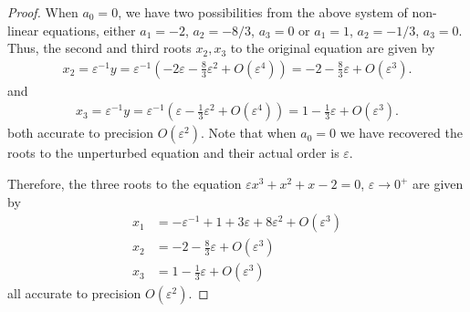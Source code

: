 \documentclass[12pt]{article}
\theoremstyle{definition}
\begin{document}
\begin{proof}
  When $a_0 = 0$, we have two possibilities from the above system of non-linear equations, either
  $a_1 = -2$, $a_2 = -8/3$, $a_3 = 0$ or $a_1=1$, $a_2 = -1/3$, $a_3 = 0$.
  Thus, the second and third roots $x_2, x_3$ to the original equation are given by
  \begin{align*}
    x_2 = \varepsilon^{-1}y = \varepsilon^{-1}\left(-2\varepsilon -\frac{8}{3} \varepsilon^2  + O(\varepsilon^4)\right) = -2 -\frac{8}{3} \varepsilon  + O(\varepsilon^3).
  \end{align*}
  and
  \begin{align*}
    x_3 = \varepsilon^{-1}y = \varepsilon^{-1}\left(\varepsilon -\frac{1}{3} \varepsilon^2  + O(\varepsilon^4)\right) = 1 -\frac{1}{3} \varepsilon  + O(\varepsilon^3).
  \end{align*}
  both accurate to precision $O(\varepsilon^2)$. Note that when $a_0 =0$ we have recovered the roots to the unperturbed equation and their actual order is $\varepsilon$.

  Therefore, the three roots to the equation $\varepsilon x^3 + x^2 +x - 2 = 0$, $\varepsilon \to 0^+$ are given by
  \begin{align*}
    x_1 &= -\varepsilon^{-1} + 1 + 3 \varepsilon + 8 \varepsilon^2 + O(\varepsilon^3) \\
    x_2 &= -2 -\frac{8}{3} \varepsilon  + O(\varepsilon^3) \\
    x_3 &= 1 -\frac{1}{3} \varepsilon  + O(\varepsilon^3)
  \end{align*}
  all accurate to precision $O(\varepsilon^2)$.
\end{proof}
\end{document}
